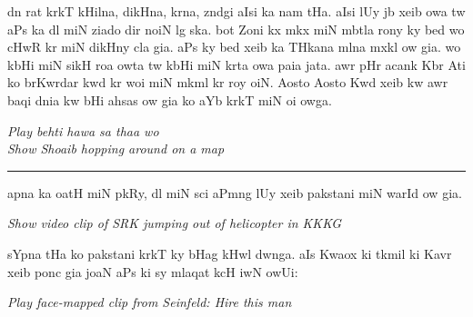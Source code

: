 \documentclass{article}
\begin{document}
	dn rat krkT kHilna, dikHna,  krna, zndgi aIsi ka nam tHa.
	aIsi lUy jb xeib  owa tw aPs ka dl  miN ziado dir noiN lg ska.
	bot Zoni kx mkx miN mbtla rony ky bed wo  cHwR kr  miN  dikHny cla gia.
	aPs ky bed xeib ka THkana mlna mxkl ow gia.
	wo kbHi  miN  sikH roa owta tw kbHi  miN  krta owa paia jata.
	awr pHr acank Kbr Ati ko brKwrdar  kwd kr woi  miN mkml kr roy oiN. 
	Aosto Aosto Kwd xeib kw awr baqi dnia kw bHi ahsas ow gia ko aYb  krkT miN oi owga.

\begin{enpara}
	\itshape
	Play behti hawa sa thaa wo\\
	Show Shoaib hopping around on a map
\end{enpara}

\rule{\textwidth}{1pt}

	apna  ka  oatH miN pkRy, dl miN sci aPmng lUy xeib pakstani miN warId ow gia.

\begin{enpara}
	\itshape
	Show video clip of SRK jumping out of helicopter in KKKG
\end{enpara}
\vspace{0.5\baselineskip}

	sYpna tHa ko pakstani krkT ky bHag kHwl dwnga.
	aIs Kwaox ki tkmil ki Kavr xeib  ponc gia joaN aPs ki  sy mlaqat kcH iwN owUi: 

\begin{enpara}
	\itshape
	Play face-mapped clip from Seinfeld: Hire this man
\end{enpara}
\end{document}
